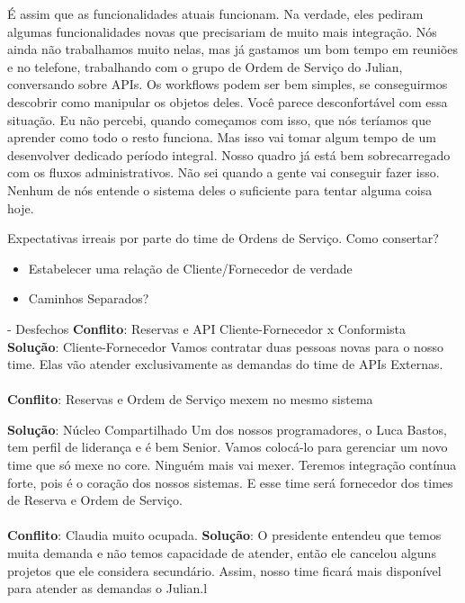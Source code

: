 \documentclass[12pt,play]{article}
\begin{document}
É assim que as funcionalidades atuais funcionam. Na verdade, eles pediram algumas funcionalidades novas que precisariam de muito mais integração. Nós ainda não trabalhamos muito nelas, mas já gastamos um bom tempo em reuniões e no telefone, trabalhando com o grupo de Ordem de Serviço do Julian, conversando sobre APIs. Os workflows podem ser bem simples, se conseguirmos descobrir como manipular os objetos deles.
\dani Você parece desconfortável com essa situação.
\clau Eu não percebi, quando começamos com isso, que nós teríamos que aprender como todo o resto funciona. Mas isso vai tomar algum tempo de um desenvolver dedicado período integral. Nosso quadro já está bem sobrecarregado com os fluxos administrativos. Não sei quando a gente vai conseguir fazer isso. Nenhum de nós entende o sistema deles o suficiente para tentar alguma coisa hoje.

\narr Expectativas irreais por parte do time de Ordens de Serviço. Como consertar?
\begin{itemize}
	\item Estabelecer uma relação de Cliente/Fornecedor de verdade
	\item Caminhos Separados?
\end{itemize}

\act - Desfechos
\scene
\narr
\textbf{Conflito}: Reservas e API Cliente-Fornecedor x Conformista
\textbf{Solução}: Cliente-Fornecedor
\alex Vamos contratar duas pessoas novas para o nosso time. Elas vão atender exclusivamente as demandas do time de APIs Externas.
\\
\\
\narr
\textbf{Conflito}: Reservas e Ordem de Serviço mexem no mesmo sistema

\textbf{Solução}: Núcleo Compartilhado
\julian Um dos nossos programadores, o Luca Bastos, tem perfil de liderança e é bem Senior. Vamos colocá-lo para gerenciar um novo time que só mexe no core. Ninguém mais vai mexer. Teremos integração contínua forte, pois é o coração dos nossos sistemas. E esse time será fornecedor dos times de Reserva e Ordem de Serviço.
\\
\\
\textbf{Conflito}: Claudia muito ocupada.
\textbf{Solução}:
\clau O presidente entendeu que temos muita demanda e não temos capacidade de atender, então ele cancelou alguns projetos que ele considera secundário. Assim, nosso time ficará mais disponível para atender as demandas o Julian.l
\\
\\
\end{document}
